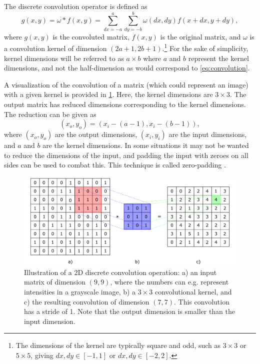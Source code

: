 The discrete convolution operator is defined as \cite[899-901]{cormenalgorithms}
\begin{equation}
    \label{eq:convolution}
    g(x,y) = \omega \ast f(x,y) = \sum_{dx=-a}^{a}\sum_{dy=-b}^{b} \omega(dx,dy)f(x+dx,y+dy),
\end{equation}
where $g(x,y)$ is the convoluted matrix, $f(x,y)$ is the original matrix, and $\omega$ is a convolution kernel of dimension $(2a+1,2b+1)$.\footnote{The dimensions of the kernel are typically square and odd, such as $3\times3$ or $5\times5$, giving $dx,dy\in[-1,1]$ or $dx,dy\in[-2,2]$. } For the sake of simplicity, kernel dimensions will be referred to as $a\times b$ where $a$ and $b$ represent the kernel dimensions, and not the half-dimension as would correspond to \cref{eq:convolution}. 

A visualization of the convolution of a matrix (which could represent an image) with a given kernel is provided in \cref{fig:convolution}. Here, the kernel dimensions are $3\times3$. The output matrix has reduced dimensions corresponding to the kernel dimensions. The reduction can be given as 
\begin{equation}
    \left( x_o,y_o \right) = \left( x_i - \left(a - 1\right), x_i - \left( b - 1 \right) \right),
\end{equation}
where $(x_o,y_o)$ are the output dimensions, $(x_i,y_i)$ are the input dimensions, and $a$ and $b$ are the kernel dimensions. In some situations it may not be wanted to reduce the dimensions of the input, and padding the input with zeroes on all sides can be used to combat this. This technique is called zero-padding \cite{oshea2015introduction}. 
\begin{figure}[htbp]  
    \centering
    \includegraphics[width=.85\textwidth]{figures/convolution.pdf}
    \caption[Illustration of a 2D discrete convolution]{Illustration of a 2D discrete convolution operation: a) an input matrix of dimension $(9,9)$, where the numbers can e.g. represent intensities in a grayscale image, b) a $3\times3$ convolutional kernel, and c) the resulting convolution of dimension $(7,7)$. This convolution has a stride of 1. Note that the output dimension is smaller than the input dimension. }
    \label{fig:convolution}
\end{figure}

